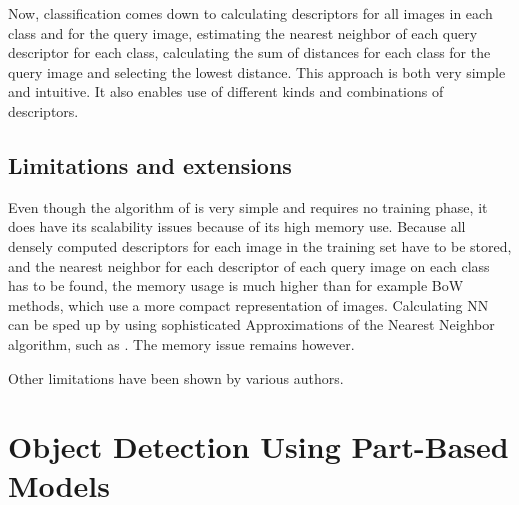 \documentclass[a4paper,10pt]{article}
\begin{document}
Now, classification comes down to calculating descriptors for all images in each class and for the query image, estimating the nearest neighbor of each query descriptor for each class, calculating the sum of distances for each class for the query image and selecting the lowest distance. This approach is both very simple and intuitive. It also enables use of different kinds and combinations of descriptors.

\subsection{Limitations and extensions} %
\label{sub:limitations_and_extensions}

Even though the algorithm of \cite{boiman2008defense} is very simple and requires no training phase, it does have its scalability issues because of its high memory use. Because all densely computed descriptors for each image in the training set have to be stored, and the nearest neighbor for each descriptor of each query image on each class has to be found, the memory usage is much higher than for example BoW methods, which use a more compact representation of images. Calculating NN can be sped up by using sophisticated Approximations of the Nearest Neighbor algorithm, such as . The memory issue remains however.

Other limitations have been shown by various authors. \cite{behmo2010towards, wang2011improved,mccann2011local,tuytelaars2011nbnn,timofte2012iterative}



\section{Object Detection Using Part-Based Models} %
\label{sec:object_detection}

\end{document}
